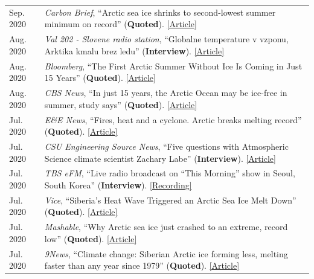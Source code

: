 \documentclass[margin,line,palatino,courier,10pt]{res}
\begin{document}
\begin{resume}
\begin{tabular}{@{}p{0.9in}p{4in}}
\end{tabular}
\begin{tabular}{@{}p{0.9in}p{4in}}
Sep. 2020 & \textit{Carbon Brief}, ``Arctic sea ice shrinks to second-lowest summer minimum on record'' (\textbf{Quoted}). \href{https://www.carbonbrief.org/arctic-sea-ice-shrinks-to-second-lowest-summer-minimum-on-record}{[Article]}\\
Aug. 2020 & \textit{Val 202 - Slovene radio station}, ``Globalne temperature v vzponu, Arktika kmalu brez ledu'' (\textbf{Interview}). \href{https://val202.rtvslo.si/2020/08/aktualno-20/}{[Article]}\\
Aug. 2020 & \textit{Bloomberg}, ``The First Arctic Summer Without Ice Is Coming in Just 15 Years'' (\textbf{Quoted}). \href{https://www.bloomberg.com/news/articles/2020-08-17/the-first-arctic-summer-without-ice-is-coming-in-just-15-years?srnd=premium}{[Article]}\\
Aug. 2020 & \textit{CBS News}, ``In just 15 years, the Arctic Ocean may be ice-free in summer, study says'' (\textbf{Quoted}). \href{https://www.cbsnews.com/news/arctic-ocean-climate-change-ice-free-15-years/}{[Article]}\\
Jul. 2020 & \textit{E\&E News}, ``Fires, heat and a cyclone. Arctic breaks melting record'' (\textbf{Quoted}). \href{https://www.eenews.net/stories/1063658765}{[Article]}\\
Jul. 2020 & \textit{CSU Engineering Source News}, ``Five questions with Atmospheric Science climate scientist Zachary Labe'' (\textbf{Interview}). \href{https://engr.source.colostate.edu/five-questions-with-climate-scientist-zachary-labe/}{[Article]}\\
Jul. 2020 & \textit{TBS eFM}, ``Live radio broadcast on “This Morning” show in Seoul, South Korea'' (\textbf{Interview}). \href{https://podcasts.apple.com/kr/podcast/0724-in-focus-1-effects-human-induced-climate-change/id1038822609?i=1000485914634&l=en}{[Recording]}\\
Jul. 2020 & \textit{Vice}, ``Siberia's Heat Wave Triggered an Arctic Sea Ice Melt Down'' (\textbf{Quoted}). \href{https://www.vice.com/en_us/article/ep45be/siberias-heat-wave-triggered-an-arctic-sea-ice-melt-down}{[Article]}\\
Jul. 2020 & \textit{Mashable}, ``Why Arctic sea ice just crashed to an extreme, record low'' (\textbf{Quoted}). \href{https://mashable.com/article/arctic-sea-ice-plummets-2020/}{[Article]}\\
Jul. 2020 & \textit{9News}, ``Climate change: Siberian Arctic ice forming less, melting faster than any year since 1979'' (\textbf{Quoted}). \href{https://www.9news.com.au/world/climate-change-global-warming-siberian-heatwave-arctic-ice-melting-faster-us-research-data/}{[Article]}\\

\end{tabular}
\end{resume}
\end{document}
